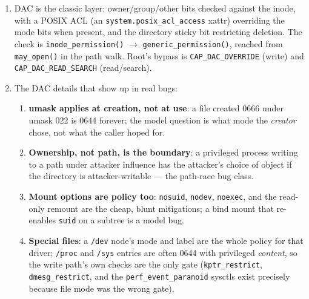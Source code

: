 \documentclass[12pt]{Training}
\begin{document}
\begin{enumerate}
\begin{enumerate}
        \begin{enumerate}
            \item Linux's equivalents of the attested identity are \lstinline{SO_PEERCRED}, \lstinline{SCM_CREDENTIALS}, and \lstinline{getsockopt(SO_PEERSEC)} for the peer's LSM label.
            \item Android's is \lstinline{Binder.getCallingUid()}.
        \end{enumerate}
    \end{enumerate}
    \item DAC is the classic layer: owner/group/other bits checked against the inode, with a POSIX ACL (an \lstinline{system.posix_acl_access} xattr) overriding the mode bits when present, and the directory sticky bit restricting deletion. The check is \lstinline{inode_permission()} $\to$ \lstinline{generic_permission()}, reached from \lstinline{may_open()} in the path walk. Root's bypass is \lstinline{CAP_DAC_OVERRIDE} (write) and \lstinline{CAP_DAC_READ_SEARCH} (read/search).
    \item The DAC details that show up in real bugs:
    \begin{enumerate}
        \item \textbf{umask applies at creation, not at use}: a file created 0666 under umask 022 is 0644 forever; the model question is what mode the \emph{creator} chose, not what the caller hoped for.
        \item \textbf{Ownership, not path, is the boundary}: a privileged process writing to a path under attacker influence has the attacker's choice of object if the directory is attacker-writable --- the path-race bug class.
        \item \textbf{Mount options are policy too}: \lstinline{nosuid}, \lstinline{nodev}, \lstinline{noexec}, and the read-only remount are the cheap, blunt mitigations; a bind mount that re-enables \lstinline{suid} on a subtree is a model bug.
        \item \textbf{Special files}: a \lstinline{/dev} node's mode and label are the whole policy for that driver; \lstinline{/proc} and \lstinline{/sys} entries are often 0644 with privileged \emph{content}, so the write path's own checks are the only gate (\lstinline{kptr_restrict}, \lstinline{dmesg_restrict}, and the \lstinline{perf_event_paranoid} sysctls exist precisely because file mode was the wrong gate).
    \end{enumerate}
\end{enumerate}
\end{document}
